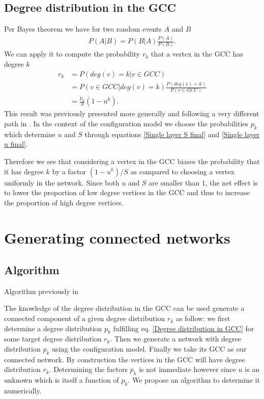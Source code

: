 \documentclass[
11pt, %
english, %
singlespacing, %
nolistspacing, %
liststotoc, %
headsepline, %
]{MastersDoctoralThesis} %
\begin{document}

\subsection{Degree distribution in the GCC}
\label{Section: Degree distribution in the GCC}

Per Bayes theorem we have for two random events $A$ and $B$
\begin{align}
	P(A | B) = P(B | A) \frac{P(A)}{P(B)}. \label{Bayes theorem}
\end{align}
We can apply it to compute the probability $r_k$ that a vertex in the GCC has degree $k$
\begin{align}
	r_k &= P\left(deg(v) = k | v \in GCC\right)\\
	&= P(v \in GCC | deg(v) = k) \frac{P(deg(v) = k)}{P(v \in GCC)} \\
	&= \frac{p_k}{S} (1 - u^k). \label{Degree distribution in GCC}
\end{align}
This result was previously presented more generally and following a very different path in \cite{bauer2002maximal}. In the context of the configuration model we choose the probabilities $p_k$ which determine $u$ and $S$ through equations \eqref{Single layer S final} and \eqref{Single layer u final}.

Therefore we see that considering a vertex in the GCC biases the probability that it has degree $k$ by a factor $(1 - u^k)/S$ as compared to choosing a vertex uniformly in the network. Since both $u$ and $S$ are smaller than $1$, the net effect is to lower the proportion of low degree vertices in the GCC and thus to increase the proportion of high degree vertices.

\section{Generating connected networks}
\label{Section: Generating connected networks}

\subsection{Algorithm}

Algorithm previously in \cite{bialas2008correlations}

The knowledge of the degree distribution in the GCC can be used generate a connected component of a given degree distribution $r_k$ as follow: we first determine a degree distribution $p_k$ fulfilling eq. \eqref{Degree distribution in GCC} for some target degree distribution $r_k$. Then we generate a network with degree distribution $p_k$ using the configuration model. Finally we take its GCC as our connected network. By construction the vertices in the GCC will have degree distribution $r_k$. Determining the factors $p_k$ is not immediate however since $u$ is an unknown which is itself a function of $p_k$. We propose an algorithm to determine it numerically.
\end{document}
